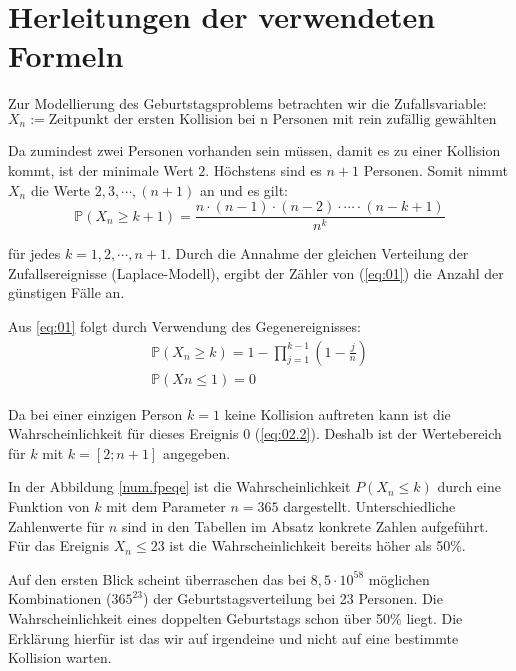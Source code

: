 \documentclass[../main.tex]{subfiles}
\begin{document}
\section{Herleitungen der verwendeten Formeln}
\begin{flushleft}
Zur Modellierung des Geburtstagsproblems betrachten wir die Zufallsvariable:
    \begin{equation}
      X_{ n } := \text{Zeitpunkt der ersten Kollision bei n Personen mit rein zufällig gewählten Geburtstagen} \label {first}
    \end{equation}


Da zumindest zwei Personen vorhanden sein müssen, damit es zu einer Kollision kommt, ist der minimale Wert $2$. Höchstens sind es $n + 1$ Personen. Somit nimmt $X_{ n }$ die Werte $2,3,\cdots ,(n+1)$ an und es gilt:
   \begin{equation}  \label{eq:01}
   \mathbb{P}(X_{ n } \geq k + 1)  = \frac{ n \cdot (n - 1) \cdot (n - 2) \cdot \cdots \cdot (n - k + 1) }{ n^k }
    \end{equation}

für jedes $k = 1,2,\cdots,n + 1$. Durch die Annahme der gleichen Verteilung der Zufallsereignisse (Laplace-Modell), ergibt der Zähler von (\ref{eq:01}) die Anzahl der günstigen Fälle an. \newline

Aus \ref{eq:01} folgt durch Verwendung des Gegenereignisses:
\begin{eqnarray}
\mathbb{P}(X_{ n } \geq k) = 1 - \prod_{ j=1 }^{k-1}{ (1 - \frac{ j }{ n }) }  \label{eq:02.1} \\
\mathbb{P}(Xn\leq 1) = 0  \label{eq:02.2}
\end{eqnarray}

Da bei einer einzigen Person $k = 1$ keine Kollision auftreten kann ist die Wahrscheinlichkeit für dieses Ereignis 0 (\ref{eq:02.2}). Deshalb ist der Wertebereich für $k$ mit $k = [2;n+1]$ angegeben. \newline

In der Abbildung \ref{num.fpeqe} ist die Wahrscheinlichkeit $P(X_{n} \leq k)$ durch eine Funktion von $k$ mit dem Parameter $n = 365$ dargestellt. Unterschiedliche Zahlenwerte für $n$ sind in den Tabellen im Absatz konkrete Zahlen aufgeführt. Für das Ereignis $ X_{n} \leq 23 $ ist die Wahrscheinlichkeit bereits höher als 50\%. \newline

Auf den ersten Blick scheint überraschen das bei $8,5 \cdot 10^{58}$ möglichen Kombinationen ($365^{23}$) der Geburtstagsverteilung bei 23 Personen. Die Wahrscheinlichkeit eines doppelten Geburtstags schon über 50\% liegt.
Die Erklärung hierfür ist das wir auf irgendeine und nicht auf eine bestimmte Kollision warten. 



\end{flushleft}
\end{document}
